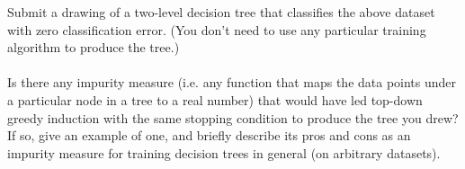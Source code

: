 \subproblem[5] Submit a drawing of a two-level decision tree that classifies the above dataset with zero classification error. (You don’t need to use any particular training algorithm to produce the tree.)\\
\\
Is there any impurity measure (i.e. any function that maps the data points under a particular node in a tree to a real number) that would have led top-down greedy induction with the same stopping condition to produce the tree you drew? If so, give an example of one, and briefly describe its pros and cons as an impurity measure for training decision trees in general (on arbitrary datasets).
\begin{subsolution}\end{subsolution}
\newpage


